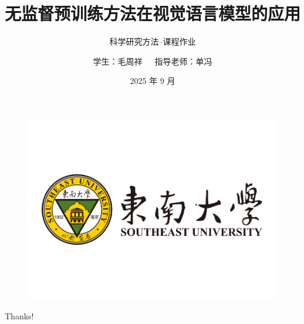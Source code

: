 \documentclass{beamer}
\author{学生：毛周祥~~~指导老师：单冯}
\title{无监督预训练方法在视觉语言模型的应用}
\subtitle{科学研究方法--课程作业}
\institute{东南大学计算机拔尖培养基地}
\date{2025 年 9 月}
\begin{document}
\kaishu
\begin{frame}
    \titlepage
    \begin{figure}[htpb]
        \begin{center}
            \includegraphics[width=0.25\linewidth]{pic/CLTlogo.jpg}
        \end{center}
    \end{figure}
\end{frame}

\begin{frame}
    \tableofcontents[sectionstyle=show,subsectionstyle=show/shaded/hide,subsubsectionstyle=show/shaded/hide]
\end{frame}


\begin{frame}
    \begin{center}
        {\Huge\calligra Thanks!}
    \end{center}
\end{frame}
\end{document}
